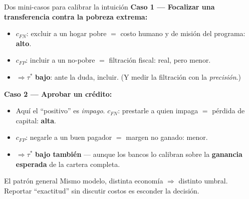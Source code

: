 \documentclass{beamer}
\newcommand{\1}{\mathbb{I}}
\begin{document}
\begin{frame}{Dos mini-casos para calibrar la intuición}
\small
\textbf{Caso 1 --- Focalizar una transferencia contra la pobreza extrema:}
\begin{itemize}\itemsep3pt
  \item $c_{FN}$: excluir a un hogar pobre $=$ costo humano y de misión del programa: \textbf{alto}.
  \item $c_{FP}$: incluir a un no-pobre $=$ filtración fiscal: real, pero menor.
  \item $\Rightarrow \tau^*$ \textbf{bajo}: ante la duda, incluir. (Y medir la filtración con la \emph{precisión}.)
\end{itemize}
\pause

\vspace{0.2cm}
\textbf{Caso 2 --- Aprobar un crédito:}
\begin{itemize}\itemsep2pt
  \item Aquí el ``positivo'' es \emph{impago}. $c_{FN}$: prestarle a quien impaga $=$ pérdida de capital: \textbf{alta}.
  \item $c_{FP}$: negarle a un buen pagador $=$ margen no ganado: menor.
  \item $\Rightarrow \tau^*$ \textbf{bajo también} --- aunque los bancos lo calibran sobre la \textbf{ganancia esperada} de la cartera completa.
\end{itemize}
\pause

\begin{block}{El patrón general}
Mismo modelo, distinta economía $\Rightarrow$ distinto umbral. Reportar ``exactitud'' sin discutir costos es esconder la decisión.
\end{block}
\end{frame}
\end{document}
